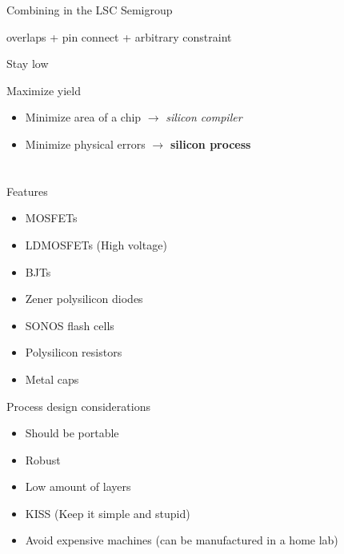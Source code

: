 \documentclass[aspectratio=169]{beamer}
\begin{document}
\begin{frame}{Combining in the LSC Semigroup}
    \begin{center}
        overlaps + pin connect + arbitrary constraint
    \end{center}
\end{frame}

\begin{frame}{Stay low}
\end{frame}

\begin{frame}{Maximize yield}
	\begin{itemize}
        \setlength\itemsep{1em}
		\item Minimize area of a chip $\rightarrow$ \textit{silicon compiler}
		\item Minimize physical errors $\rightarrow$ \textbf{silicon process}
	\end{itemize}
\end{frame}


\section[Process]{}

\begin{frame}{Features}
	\begin{itemize}
        \setlength\itemsep{1em}
		\item MOSFETs
		\item LDMOSFETs (High voltage) 
		\item BJTs
		\item Zener polysilicon diodes
		\item SONOS flash cells
		\item Polysilicon resistors
		\item Metal caps
	\end{itemize}
\end{frame}

\begin{frame}{Process design considerations}
	\begin{itemize}
		\item Should be portable
		\item Robust
		\item Low amount of layers
		\item KISS (Keep it simple and stupid)
		\item Avoid expensive machines (can be manufactured in a home lab)
	\end{itemize}
\end{frame}
\end{document}
